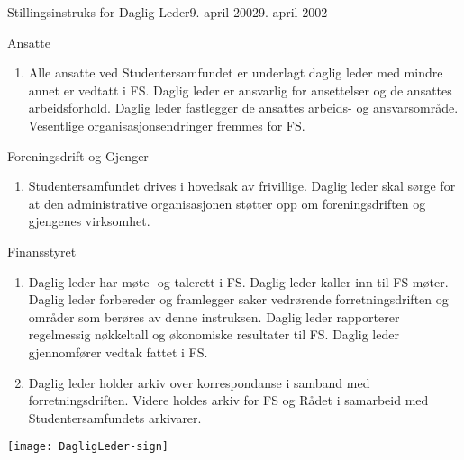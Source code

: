 \documentclass[fsbok.tex]{subfiles}
\begin{document}
\begin{instruks}{Stillingsinstruks for Daglig Leder}{9. april 2002}{9. april 2002}
    \begin{instruksledd}{Ansatte}
        \begin{enumerate}
            \item Alle ansatte ved Studentersamfundet er underlagt daglig leder med mindre annet er vedtatt 
                i FS. Daglig leder er ansvarlig for
                ansettelser og de ansattes arbeidsforhold. Daglig leder fastlegger de ansattes arbeids- og ansvarsområde. Vesentlige
                organisasjonsendringer fremmes for FS.
        \end{enumerate}
    \end{instruksledd}
\pagebreak
    \begin{instruksledd}{Foreningsdrift og Gjenger}
        \begin{enumerate}
            \item Studentersamfundet drives i hovedsak av frivillige. Daglig leder skal sørge for at den administrative organisasjonen
                støtter opp om foreningsdriften og gjengenes virksomhet.
        \end{enumerate}
    \end{instruksledd}

    \begin{instruksledd}{Finansstyret}
        \begin{enumerate}
            \item Daglig leder har møte- og talerett i FS. Daglig leder kaller inn til FS møter. Daglig leder 
                forbereder og framlegger saker vedrørende
                forretningsdriften og områder som berøres av denne instruksen. Daglig leder rapporterer regelmessig nøkkeltall og
                økonomiske resultater til FS. Daglig leder gjennomfører vedtak fattet i FS.
            \item Daglig leder holder arkiv over korrespondanse i samband med forretningsdriften. Videre holdes arkiv for FS og Rådet
                i samarbeid med Studentersamfundets arkivarer.
        \end{enumerate}
    \end{instruksledd}

    \begin{center}
    	\texttt{[image: DagligLeder-sign]}
    \end{center}

\end{instruks}
\end{document}
